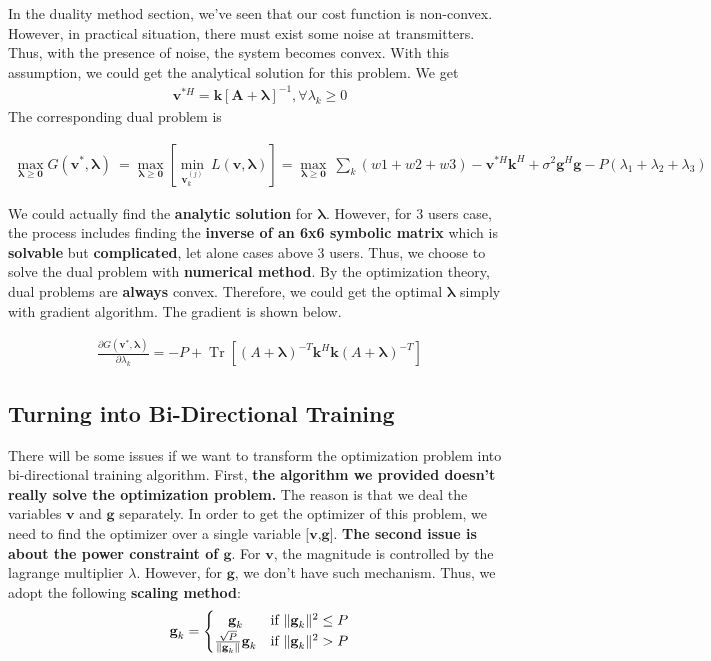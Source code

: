 \documentclass[11pt, oneside]{article}   	%
\DeclareMathOperator{\Tr}{Tr}
\begin{document}
In the duality method section, we've seen that our cost function is non-convex. However, in practical situation, there must exist some noise at transmitters. Thus, with the presence of noise, the system becomes convex. With this assumption, we could get the analytical solution for this problem. 
We get 
\begin{align*}
\textbf{v}^{*H} = \textbf{k}[\textbf{A}+\pmb{\lambda}]^{-1}, \forall \lambda_{k} \geq 0
\end{align*}
The corresponding dual problem is

\begin{align*}
\max_{	\pmb{\lambda} \geq \textbf{0}	}	G( \textbf{v}^{*}, \pmb{\lambda} ) \ = 
\max_{	\pmb{\lambda}	\geq \textbf{0}}
[
\min_{\textbf{v}_{k}^{(j)}}\
L( \textbf{v}, \pmb{\lambda} )]=
\max_{	\pmb{\lambda}	\geq \textbf{0}}\ \displaystyle\sum_{k} (w1+w2+w3) - \textbf{v}^{*H}\textbf{k}^{H} + \sigma^{2} \textbf{g}^{H} \textbf{g} - P(\lambda_{1}+\lambda_{2}+\lambda_{3})
\end{align*}


We could actually find the \textbf{analytic solution} for $\pmb{\lambda}$. However, for 3 users case, the process includes finding the \textbf{inverse of an 6x6 symbolic matrix}  which is \textbf{solvable} but \textbf{complicated}, let alone cases above 3 users. Thus, we choose to solve the dual problem with \textbf{numerical method}. By the optimization theory, dual problems are \textbf{always} convex. Therefore, we could get the optimal $\pmb{\lambda}$ simply with gradient algorithm. The gradient is shown below.

\begin{align*}
\frac{\partial G( \textbf{v}^{*}, \pmb{\lambda} )}{\partial \lambda_{k}} = 
-P+
\Tr[
(A+\pmb{\lambda})^{-T}\textbf{k}^{H}\textbf{k}(A+\pmb{\lambda})^{-T}
]
\end{align*}




\subsection{Turning into Bi-Directional Training}
There will be some issues if we want to transform the optimization problem into bi-directional training algorithm. First, \textbf{the algorithm we provided doesn't really solve the optimization problem.} The reason is that we deal the variables $\textbf{v}$ and $\textbf{g}$ separately. In order to get the optimizer of this problem, we need to find the optimizer over a single variable [$\textbf{v}$,$\textbf{g}$]. \textbf{The second issue is about the power constraint of $\textbf{g}$}. For $\textbf{v}$, the magnitude is controlled by the lagrange multiplier $\lambda$. However, for $\textbf{g}$, we don't have such mechanism. Thus, we adopt the following \textbf{scaling method}: 
\[
  \textbf{g}_k = \left\{\def\arraystretch{1.2}%
  \begin{array}{@{}c@{\quad}l@{}}
    \textbf{g}_k  & \text{if $\| \textbf{g}_k \|^{2} \leq P$}\\
    \frac{\sqrt{P}}{\| \textbf{g}_k \|} \textbf{g}_k& \text{if $\| \textbf{g}_k \|^{2} > P$}\\
  \end{array}\right.
\]
\end{document}
